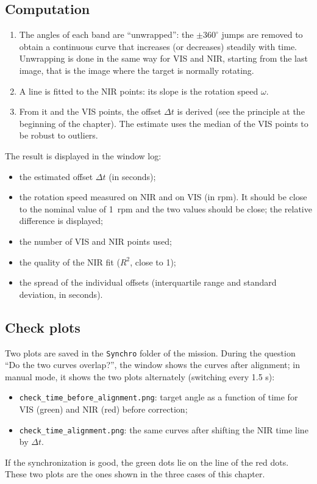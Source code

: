 \documentclass[a4paper,11pt]{report}
\begin{document}
\subsection*{Computation}
\begin{enumerate}
  \item The angles of each band are ``unwrapped'': the $\pm 360^\circ$ jumps are removed to obtain a continuous curve that increases (or decreases) steadily with time. Unwrapping is done in the same way for VIS and NIR, starting from the last image, that is the image where the target is normally rotating.
  \item A line is fitted to the NIR points: its slope is the rotation speed $\omega$.
  \item From it and the VIS points, the offset $\Delta t$ is derived (see the principle at the beginning of the chapter). The estimate uses the median of the VIS points to be robust to outliers.
\end{enumerate}
The result is displayed in the window log:
\begin{itemize}
  \item the estimated offset $\Delta t$ (in seconds);
  \item the rotation speed measured on NIR and on VIS (in rpm). It should be close to the nominal value of 1~rpm and the two values should be close; the relative difference is displayed;
  \item the number of VIS and NIR points used;
  \item the quality of the NIR fit ($R^2$, close to 1);
  \item the spread of the individual offsets (interquartile range and standard deviation, in seconds).
\end{itemize}

\subsection*{Check plots}
Two plots are saved in the \texttt{Synchro} folder of the mission. During the question ``Do the two curves overlap?'', the window shows the curves after alignment; in manual mode, it shows the two plots alternately (switching every 1.5 s):
\begin{itemize}
  \item \texttt{check\_time\_before\_alignment.png}: target angle as a function of time for VIS (green) and NIR (red) before correction;
  \item \texttt{check\_time\_alignment.png}: the same curves after shifting the NIR time line by $\Delta t$.
\end{itemize}
If the synchronization is good, the green dots lie on the line of the red dots. These two plots are the ones shown in the three cases of this chapter.
\end{document}
